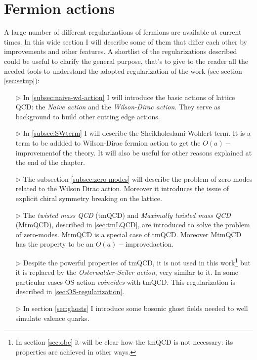 \documentclass[english, LaM, oneside, noexaminfo]{sapthesis}
\newcommand{\oaid}{$O(a)-$improved}
\newcommand{\oait}{$O(a)-$improvement}
\begin{document}
\section{Fermion actions}\label{sec:fermion-discretization}
\noindent
A large number of different regularizations of fermions are available at current times.
In this wide section I will describe some of them that differ each other by improvements and other features.
A shortlist of the regularizations described could be useful to clarify the general purpose, that's to give to the reader all the needed tools to understand the adopted regularization of the work (see section \ref{sec:setup}):
\begin{itemize}
    \item [$\triangleright$] In \ref{subsec:naive-wd-action} I will introduce the basic actions of lattice QCD: the \textit{Naive action} and the \textit{Wilson-Dirac action}.
        They serve as background to build other cutting edge actions.
    \item [$\triangleright$] In \ref{subsec:SWterm} I will describe the Sheikholeslami-Wohlert term.
        It is a term to be addded to Wilson-Dirac fermion action to get the \oait\space of the theory.
        It will also be useful for other reasons explained at the end of the chapter.
    \item [$\triangleright$] The subsection \ref{subsec:zero-modes} will describe the problem of zero modes related to the Wilson Dirac action.
        Moreover it introduces the issue of explicit chiral symmetry breaking on the lattice.
    \item [$\triangleright$] The \textit{twisted mass QCD} (tmQCD) and \textit{Maximally twisted mass QCD} (MtmQCD), described in \ref{sec:tmLQCD}, are introduced to solve the problem of zero-modes.
        MtmQCD is a special case of tmQCD. Moreover MtmQCD has the property to be an \oaid\space action.
    \item [$\triangleright$] Despite the powerful properties of tmQCD, it is not used in this work\footnote{In section \ref{sec:obc} it will be clear how the tmQCD is not necessary: its properties are achieved in other ways.} but it is replaced by the \textit{Osterwalder-Seiler action}, very similar to it.
        In some particular cases OS action \textit{coincides} with tmQCD.
        This regularization is described in \ref{sec:OS-regularization}.
    \item [$\triangleright$] In section \ref{sec:ghosts} I introduce some bosonic ghost fields needed to well simulate valence quarks.
\end{itemize}
\end{document}
